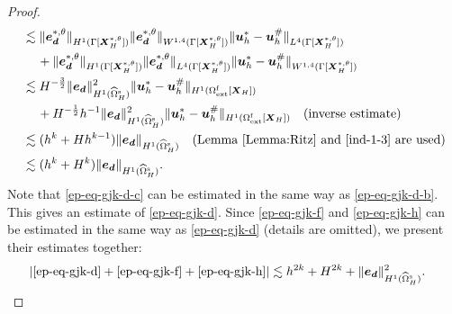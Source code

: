 \documentclass[11pt,reqno]{amsart}
\theoremstyle{definition}
\theoremstyle{plain}
\numberwithin{theorem}{section}
\numberwithin{proposition}{section}
\numberwithin{lemma}{section}
\numberwithin{equation}{section}
\newcommand{\bs}[1]{\boldsymbol{#1}}
\renewcommand{\(}{\bigl(}
\renewcommand{\)}{\bigr)}
\begin{document}
\begin{proof}
\begin{align*}
&\lesssim \|{\bs e}_{\bs d}^{*,\theta}\|_{H^1(\Gamma[{\bs X}_H^{*,\theta}])}
\|{\bs e}_{\bs d}^{*,\theta}\|_{W^{1,4}(\Gamma[{\bs X}_H^{*,\theta}])}
\|{\bs u}_h^*-{\bs u}_h^\#\|_{L^4(\Gamma[{\bs X}_H^{*,\theta}])} \\
&\quad\, 
+ \|{\bs e}_{\bs d}^{*,\theta}\|_{H^1(\Gamma[{\bs X}_H^{*,\theta}])}
\|{\bs e}_{\bs d}^{*,\theta}\|_{L^4(\Gamma[{\bs X}_H^{*,\theta}])}
\|{\bs u}_h^*-{\bs u}_h^\#\|_{W^{1,4}(\Gamma[{\bs X}_H^{*,\theta}])} \\
&\lesssim H^{-\frac32}\|{\bs e}_{\bs d}\|_{H^1(\widehat\Omega^{\rm s}_H)}^2\|{\bs u}_h^*-{\bs u}_h^\#\|_{H^1(\Omega^{\rm f}_{\rm ext}[{\bs X}_H])} \notag\\
&\quad\,
+ H^{-\frac12}h^{-1}\|{\bs e}_{\bs d}\|_{H^1(\widehat\Omega^{\rm s}_H)}^2\|{\bs u}_h^*-{\bs u}_h^\#\|_{H^1(\Omega^{\rm f}_{\rm ext}[{\bs X}_H])} \quad\mbox{(inverse estimate)} \notag\\
&\lesssim (h^k + Hh^{k-1}) \|{\bs e}_{\bs d}\|_{H^1(\widehat\Omega^{\rm s}_H)} 
\quad\mbox{(Lemma \ref{Lemma:Ritz} and \eqref{ind-1-3} are used)} \notag\\
&\lesssim (h^k + H^k) \|{\bs e}_{\bs d}\|_{H^1(\widehat\Omega^{\rm s}_H)}.
\end{align*}
Note that \eqref{ep-eq-gjk-d-c} can be estimated in the same way as \eqref{ep-eq-gjk-d-b}. This gives an estimate of \eqref{ep-eq-gjk-d}. Since \eqref{ep-eq-gjk-f} and \eqref{ep-eq-gjk-h} can be estimated in the same way as \eqref{ep-eq-gjk-d} (details are omitted), we present their estimates together:  
\begin{align}
|\eqref{ep-eq-gjk-d}+\eqref{ep-eq-gjk-f}+\eqref{ep-eq-gjk-h}| 
&\lesssim h^{2k}+H^{2k} + \|{\bs e}_{\bs d}\|_{H^1(\widehat{\Omega}_H^{\rm s})}^2  . \end{align}


\end{proof}
\end{document}
